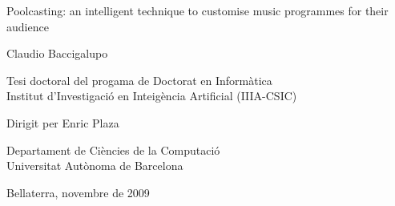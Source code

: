\documentclass[a4paper,11pt]{memoir}
\makeatletter
\theoremstyle{definition}
\def\lgem{\discretionary{l-}{l}{\hbox{l$\cdot$l}}}
\newenvironment{titlepage}
{%
  \if@twocolumn
    \@restonecoltrue\onecolumn
  \else
    \@restonecolfalse\newpage
  \fi
  \thispagestyle{empty}%
  \setcounter{page}\z@
}%
{\if@restonecol\twocolumn \else \newpage \fi
}
\makeatother
\begin{document}
\sloppy

\pagestyle{test}


\begin{titlepage}
 \begin{center}
  \vspace*{1in} {\Huge Poolcasting: an intelligent technique to customise music programmes for their audience} 
  \par \vspace{1.5in} {\Large Claudio Baccigalupo} 
  \par \vfill Tesi doctoral del progama de Doctorat en Inform\`{a}tica\\
  Institut d'Investigaci\'{o} en Inte\lgem ig\`{e}ncia Artificial (IIIA-CSIC)
  \par \vspace{0.5in} Dirigit per Enric Plaza
  \par \vspace{0.5in} Departament de Ci\`{e}ncies de la Computaci\'{o}\\
  Universitat Aut\`{o}noma de Barcelona
  \par \vspace{0.5in} Bellaterra, novembre de 2009 
 \end{center}
\end{titlepage}
 
\end{document}
